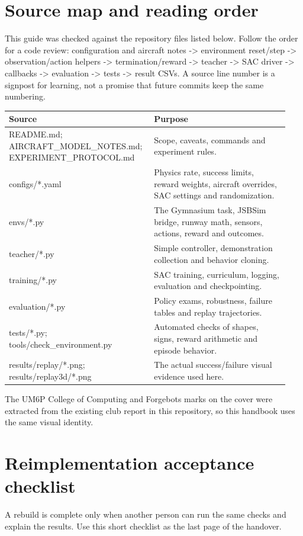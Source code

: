 \documentclass[11pt,a4paper]{article}
\begin{document}
\section{Source map and reading order}
This guide was checked against the repository files listed below. Follow the order for a code review: configuration and aircraft notes -> environment reset/step -> observation/action helpers -> termination/reward -> teacher -> SAC driver -> callbacks -> evaluation -> tests -> result CSVs. A source line number is a signpost for learning, not a promise that future commits keep the same numbering.

\begin{longtable}{|p{0.47\linewidth}|p{0.47\linewidth}|}\hline
Source & Purpose \\ \hline
README.md; AIRCRAFT\_MODEL\_NOTES.md; EXPERIMENT\_PROTOCOL.md & Scope, caveats, commands and experiment rules. \\ \hline
configs/*.yaml & Physics rate, success limits, reward weights, aircraft overrides, SAC settings and randomization. \\ \hline
envs/*.py & The Gymnasium task, JSBSim bridge, runway math, sensors, actions, reward and outcomes. \\ \hline
teacher/*.py & Simple controller, demonstration collection and behavior cloning. \\ \hline
training/*.py & SAC training, curriculum, logging, evaluation and checkpointing. \\ \hline
evaluation/*.py & Policy exams, robustness, failure tables and replay trajectories. \\ \hline
tests/*.py; tools/check\_environment.py & Automated checks of shapes, signs, reward arithmetic and episode behavior. \\ \hline
results/replay/*.png; results/replay3d/*.png & The actual success/failure visual evidence used here. \\ \hline
\end{longtable}
The UM6P College of Computing and Forgebots marks on the cover were extracted from the existing club report in this repository, so this handbook uses the same visual identity.

\section{Reimplementation acceptance checklist}
A rebuild is complete only when another person can run the same checks and explain the results. Use this short checklist as the last page of the handover.
\end{document}
